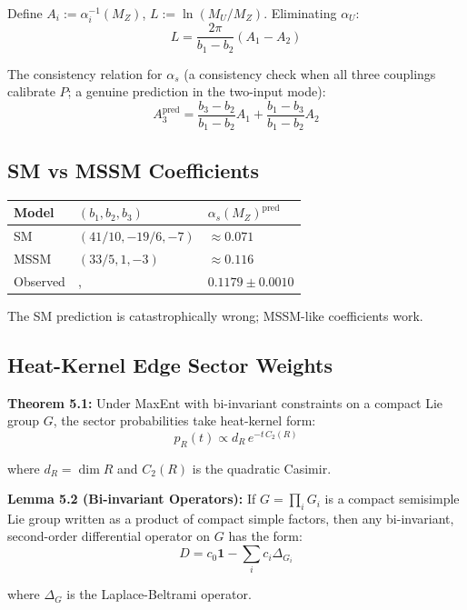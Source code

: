 Define \(A_i := \alpha_i^{-1}(M_Z)\), \(L := \ln(M_U/M_Z)\). Eliminating \(\alpha_U\): \[L = \frac{2\pi}{b_1 - b_2}(A_1 - A_2)\]

The consistency relation for \(\alpha_s\) (a consistency check when all three couplings calibrate $P$; a genuine prediction in the two-input mode): \[A_3^{\text{pred}} = \frac{b_3 - b_2}{b_1 - b_2}A_1 + \frac{b_1 - b_3}{b_1 - b_2}A_2\]

\subsection{SM vs MSSM Coefficients}\label{52-sm-vs-mssm-coefficients}

{\def\LTcaptype{none} %
\begin{longtable}[]{@{}>{\RaggedRight\arraybackslash}p{}>{\RaggedRight\arraybackslash}p{}>{\RaggedRight\arraybackslash}p{}@{}}
\toprule\noalign{}
Model & \((b_1, b_2, b_3)\) & \(\alpha_s(M_Z)^{\text{pred}}\) \\
\midrule\noalign{}
\endhead
\bottomrule\noalign{}
\endlastfoot
SM & \((41/10, -19/6, -7)\) & \(\approx 0.071\) \\
MSSM & \((33/5, 1, -3)\) & \(\approx 0.116\) \\
Observed &, & \(0.1179 \pm 0.0010\) \\
\end{longtable}
}

The SM prediction is catastrophically wrong; MSSM-like coefficients work.

\subsection{Heat-Kernel Edge Sector Weights}\label{53-heat-kernel-edge-sector-weights}

\textbf{Theorem 5.1:} Under MaxEnt with bi-invariant constraints on a compact Lie group \(G\), the sector probabilities take heat-kernel form: \[p_R(t) \propto d_R \, e^{-t \, C_2(R)}\]

where \(d_R = \dim R\) and \(C_2(R)\) is the quadratic Casimir.

\textbf{Lemma 5.2 (Bi-invariant Operators):} If \(G=\prod_i G_i\) is a compact semisimple Lie group written as a product of compact simple factors, then any bi-invariant, second-order differential operator on \(G\) has the form: \[D = c_0 \mathbf{1} - \sum_i c_i \Delta_{G_i}\]

where \(\Delta_G\) is the Laplace-Beltrami operator.

